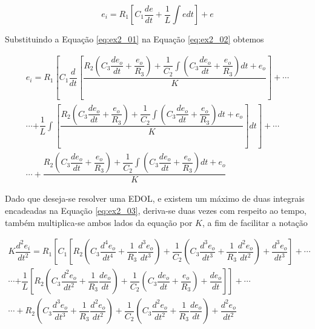 \documentclass{article}
\numberwithin{equation}{section}
\newcommand{\deo}[1]{\dfrac{d^{#1}e_o}{dt^{#1}}}
\newcommand{\dei}[1]{\dfrac{d^{#1}e_i}{dt^{#1}}}
\let\dfr\dfrac
\begin{document}
\begin{center}
\end{center}

\begin{equation}
    \label{eq:ex2_02}
    e_i = R_1\left[C_1\dfrac{de}{dt} + \dfrac{1}{L}\int edt\right] + e
\end{equation}

\noindent Substituindo a Equação \eqref{eq:ex2_01} na Equação \eqref{eq:ex2_02} obtemos

\begin{equation}
    \label{eq:ex2_03}
   \begin{split}
       e_i = R_1\left[C_1\dfrac{d}{dt}\left[\dfrac{R_2\left(C_3\dfrac{de_o}{dt} + \dfrac{e_o}{R_3}\right) + \dfrac{1}{C_2}\displaystyle\int\left(C_3\dfrac{de_o}{dt} + \dfrac{e_o}{R_3}\right)dt + e_o}{K}\right]\right.+ \cdots\\
       \cdots\left. + \dfrac{1}{L}\int \left[\dfrac{R_2\left(C_3\dfrac{de_o}{dt} + \dfrac{e_o}{R_3}\right) + \dfrac{1}{C_2}\displaystyle\int\left(C_3\dfrac{de_o}{dt} + \dfrac{e_o}{R_3}\right)dt + e_o}{K}\right]dt\right] +\cdots\\
       \cdots+\dfrac{R_2\left(C_3\dfrac{de_o}{dt} + \dfrac{e_o}{R_3}\right) + \dfrac{1}{C_2}\displaystyle\int\left(C_3\dfrac{de_o}{dt} + \dfrac{e_o}{R_3}\right)dt + e_o}{K}
   \end{split}
\end{equation}

Dado que deseja-se resolver uma EDOL, e existem um máximo de duas integrais encadeadas na Equação \eqref{eq:ex2_03}, deriva-se duas vezes com respeito ao tempo, também multiplica-se ambos lados da equação por $K$, a fim de facilitar a notação

\begin{equation*}
    \begin{split}
        K\dei{2} = R_1 \left[C_1\left[R_2\left(C_3\deo{4}+\dfr{1}{R_3}\deo{3}\right) +\dfr{1}{C_2}\left(C_3\deo{3}+\dfr{1}{R_3}\deo{2}\right) + \deo{3} \right]+\right.\cdots\\
        \cdots\left.+\dfr{1}{L}\left[R_2\left(C_3\deo{2}+\dfr{1}{R_3}\dfr{de_o}{dt}\right)+\dfr{1}{C_2}\left(C_3\dfr{de_o}{dt}+\dfr{e_o}{R_3}\right)+\dfr{de_o}{dt}\right] \right] +\cdots\\
        \cdots + R_2\left(C_3\deo{3}+\dfr{1}{R_3}\deo{2}\right)+\dfr{1}{C_2}\left(C_3\deo{2}+\dfr{1}{R_3}\dfr{de_o}{dt}\right) + \deo{2}
    \end{split}
\end{equation*}
\end{document}
